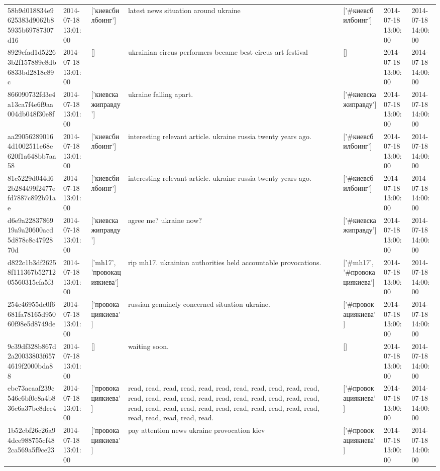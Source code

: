\begin{tabular}{lllllll}
58b9d018834e9625383d9062b85935b69787307d16 & 2014-07-18 13:01:00 & ['киевсбилбоинг'] & latest news situation around ukraine & ['#киевсбилбоинг'] & 2014-07-18 13:00:00 & 2014-07-18 14:00:00 \\
8929cfad1d52263b2f157889c8db6833bd2818c89c & 2014-07-18 13:01:00 & [] & ukrainian circus performers became best circus art festival & [] & 2014-07-18 13:00:00 & 2014-07-18 14:00:00 \\
866090732fd3e4a13ca7f4e6f9aa004db048f30e8f & 2014-07-18 13:01:00 & ['киевскажиправду'] & ukraine falling apart. & ['#киевскажиправду'] & 2014-07-18 13:00:00 & 2014-07-18 14:00:00 \\
aa290562890164d1002511e68e620f1a648bb7aa58 & 2014-07-18 13:01:00 & ['киевсбилбоинг'] & interesting relevant article. ukraine russia twenty years ago. & ['#киевсбилбоинг'] & 2014-07-18 13:00:00 & 2014-07-18 14:00:00 \\
81c5229d044d62b284499f2477efd7887c892b91ae & 2014-07-18 13:01:00 & ['киевсбилбоинг'] & interesting relevant article. ukraine russia twenty years ago. & ['#киевсбилбоинг'] & 2014-07-18 13:00:00 & 2014-07-18 14:00:00 \\
d6e9a2283786919a9a20600acd5d878c8c4792870d & 2014-07-18 13:01:00 & ['киевскажиправду'] & agree me? ukraine now? & ['#киевскажиправду'] & 2014-07-18 13:00:00 & 2014-07-18 14:00:00 \\
d822c1b3df26258f111367b5271205560315efa5f3 & 2014-07-18 13:01:00 & ['mh17', 'провокациякиева'] & rip mh17. ukrainian authorities held accountable provocations. & ['#mh17', '#провокациякиева'] & 2014-07-18 13:00:00 & 2014-07-18 14:00:00 \\
254c46955dc0f6681fa78165d95060f98e5d8749de & 2014-07-18 13:01:00 & ['провокациякиева'] & russian genuinely concerned situation ukraine. & ['#провокациякиева'] & 2014-07-18 13:00:00 & 2014-07-18 14:00:00 \\
9c39df328b867d2a20033803f6574619f2000bda88 & 2014-07-18 13:01:00 & [] & waiting soon. & [] & 2014-07-18 13:00:00 & 2014-07-18 14:00:00 \\
ebc73acaaf239c546e6bf0e8a4b836e6a37be8dcc4 & 2014-07-18 13:01:00 & ['провокациякиева'] & read, read, read, read, read, read, read, read, read, read, read, read, read, read, read, read, read, read, read, read, read, read, read, read, read, read, read, read, read, read, read, read, read, read, read, read, read, read. & ['#провокациякиева'] & 2014-07-18 13:00:00 & 2014-07-18 14:00:00 \\
1b52cbf26c26a94dce988755cf482ca569a5f9ce23 & 2014-07-18 13:01:00 & ['провокациякиева'] & pay attention news ukraine provocation kiev & ['#провокациякиева'] & 2014-07-18 13:00:00 & 2014-07-18 14:00:00 \\

\end{tabular}
